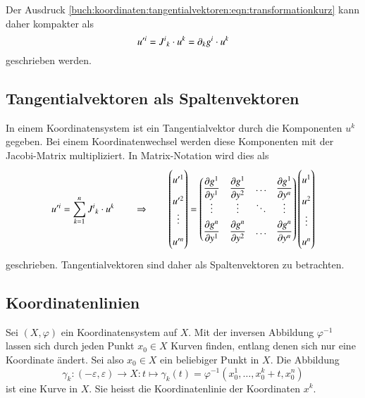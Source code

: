 Der Ausdruck
\eqref{buch:koordinaten:tangentialvektoren:eqn:transformationkurz}
kann daher kompakter als
\[
u^{\prime i}
=
J^i\mathstrut_k \cdot u^k
=
\partial_kg^i\cdot u^k
\]
geschrieben werden.

%
%
\subsection{Tangentialvektoren als Spaltenvektoren}
In einem Koordinatensystem ist ein Tangentialvektor durch die Komponenten
$u^k$ gegeben.
Bei einem Koordinatenwechsel werden diese Komponenten mit der
Jacobi-Matrix multipliziert.
In Matrix-Notation wird dies als
\[
u^{\prime i}
=
\sum_{k=1}^n
J^i\mathstrut_k \cdot u^k
\qquad\Rightarrow\qquad
\begin{pmatrix}
u^{\prime 1}\\
u^{\prime 2}\\[-2pt]
\vdots\\
u^{\prime n}
\end{pmatrix}
=
\bgroup
\renewcommand{\arraystretch}{1.8}
\begin{pmatrix}
\displaystyle\frac{\partial  g^1}{\partial y^1}&
\displaystyle\frac{\partial  g^1}{\partial y^2}&
\dots&
\displaystyle\frac{\partial  g^1}{\partial y^n}
\\[-2pt]
\vdots&\vdots&\ddots&\vdots\\
\displaystyle\frac{\partial  g^n}{\partial y^1}&
\displaystyle\frac{\partial  g^n}{\partial y^2}&
\dots&
\displaystyle\frac{\partial  g^n}{\partial y^n}
\end{pmatrix}
\egroup
\begin{pmatrix}
u^{1}\\
u^{2}\\
\vdots\\[-2pt]
u^{n}
\end{pmatrix}
\]
geschrieben.
Tangentialvektoren sind daher als Spaltenvektoren zu betrachten.
%

%
%
\subsection{Koordinatenlinien
\label{buch:koordinaten:tangentialvektoren:subsection:koordinatenlinien}}
Sei $(X,\varphi)$ ein Koordinatensystem auf $X$.
Mit der inversen Abbildung $\varphi^{-1}$ lassen sich durch jeden Punkt
$x_0\in X$ Kurven finden, entlang denen sich nur eine Koordinate
ändert.
Sei also $x_0\in X$ ein beliebiger Punkt in $X$.
Die Abbildung
\[
\gamma_k
\colon
(-\varepsilon,\varepsilon)
\to
X
:
t
\mapsto
\gamma_k(t)
=
\varphi^{-1}(x_0^1,\dots,x_0^k+t,x_0^n)
\]
ist eine Kurve in $X$.
Sie heisst die Koordinatenlinie der Koordinaten $x^k$.

